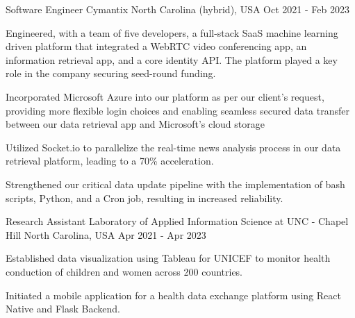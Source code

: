 \begin{cventries}
    \cventry
    {Software Engineer} %
    {Cymantix} %
    {North Carolina (hybrid), USA} %
    {Oct 2021 - Feb 2023} %
    {
      \begin{cvitems} %
        \item {Engineered, with a team of five developers,  a full-stack SaaS machine learning driven platform that integrated a WebRTC video conferencing app, an information retrieval app, and a core identity API. The platform played a key role in the company securing seed-round funding.}
        \item {Incorporated Microsoft Azure into our platform as per our client's request, providing more flexible login choices and enabling seamless secured data transfer between our data retrieval app and Microsoft's cloud storage}
        \item {Utilized Socket.io to parallelize the real-time news analysis process in our data retrieval platform, leading to a 70\% acceleration.}
        \item {Strengthened our critical data update pipeline with the implementation of bash scripts, Python, and a Cron job, resulting in increased reliability.}
      \end{cvitems}
    }

    \cventry
    {Research Assistant} %
    {Laboratory of Applied Information Science at UNC - Chapel Hill} %
    {North Carolina, USA} %
    {Apr 2021 - Apr 2023} %
    {
      \begin{cvitems} %
        \item {Established data visualization using Tableau for UNICEF to monitor health conduction of children and women across 200 countries.}
        \item {Initiated a mobile application for a health data exchange platform using React Native and Flask Backend.}
      \end{cvitems}
    }


\end{cventries}
